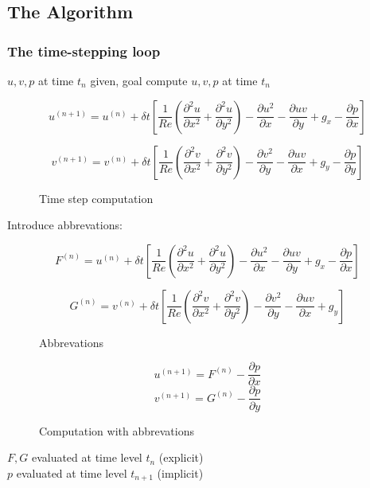 \subsection{The Algorithm}

\subsubsection{The time-stepping loop}
$u,v,p$ at time $t_n$ given, goal compute $u,v,p$ at time $t_n$

\begin{figure}[H]
	\centering
   \[u^{(n+1)} = u^{(n)} + \delta t \left[ \frac{1}{Re}\left(\frac{\partial^2 u}{\partial x^2} + \frac{\partial^2 u}{\partial y^2}\right) - \frac{\partial u^2}{\partial x} - \frac{\partial uv}{\partial y} + g_x - \frac{\partial p}{\partial x}\right]\]

   \[v^{(n+1)} = v^{(n)} + \delta t \left[ \frac{1}{Re}\left(\frac{\partial^2 v}{\partial x^2} + \frac{\partial^2 v}{\partial y^2}\right) - \frac{\partial v^2}{\partial y} - \frac{\partial uv}{\partial x} + g_y - \frac{\partial p}{\partial y}\right]\]
	\renewcommand{\thefigure}{3.38} %
	\caption{Time step computation}
	\label{fig:time-step}
\end{figure}


Introduce abbrevations:
\begin{figure}[H]
	\centering
   \[F^{(n)} = u^{(n)} + \delta t \left[ \frac{1}{Re}\left(\frac{\partial^2 u}{\partial x^2} + \frac{\partial^2 u}{\partial y^2}\right) - \frac{\partial u^2}{\partial x} - \frac{\partial uv}{\partial y} + g_x - \frac{\partial p}{\partial x}\right]\]

   \[G^{(n)} = v^{(n)} + \delta t \left[ \frac{1}{Re}\left(\frac{\partial^2 v}{\partial x^2} + \frac{\partial^2 v}{\partial y^2}\right) - \frac{\partial v^2}{\partial y} - \frac{\partial uv}{\partial x} + g_y\right]\]
	\renewcommand{\thefigure}{3.29}
	\caption{Abbrevations}
	\label{fig:abbr}
\end{figure}

\begin{figure}[H]
	\centering
   \[u^{(n+1)} = F^{(n)} - \frac{\partial p}{\partial x}\]
   \[v^{(n+1)} = G^{(n)} - \frac{\partial p}{\partial y}\]
	\renewcommand{\thefigure}{3.30, 3.31}
	\caption{Computation with abbrevations}
	\label{fig:comp-fg}
\end{figure}

$F,G$ evaluated at time level $t_n$ (explicit)\\
$p$ evaluated at time level $t_{n+1}$ (implicit)\\

